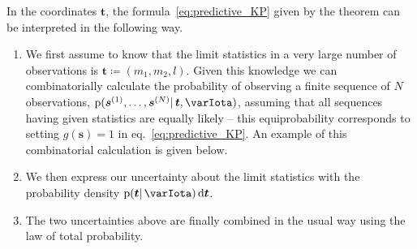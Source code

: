 \documentclass[\ifafour a4paper,12pt,\else a5paper,10pt,\fi%
onecolumn,oneside,article,%
british%
]{memoir}
\theoremstyle{remark}
\theoremstyle{innote}
\newcommand*{\di}{\mathrm{d}}%
\newcommand*{\defd}{\coloneqq}
\newcommand*{\pf}{\mathrm{p}}%
\renewcommand*{\|}{\mathpunct{|}}
\newcommand*{\eqn}{eq.}%
\newcommand*{\yI}{\varIota}
\newcommand*{\ys}{\bm{s}}
\newcommand*{\yso}[1]{\ys^{(#1)}}
\newcommand*{\yt}{\bm{t}}
\begin{document}
\bigskip

In the coordinates $\yt$, the formula~\eqref{eq:predictive_KP} given
by the theorem can be interpreted in the following way.
\begin{enumerate}[label=(\textit{\arabic*})]
\item We first assume to know that the limit statistics in a very large
  number of observations is $\yt \defd (m_1, m_2, l)$. Given this knowledge
  we can combinatorially calculate the probability of observing a finite
  sequence of $N$ observations, $\pf(\yso{1}, \dotsc, \yso{N} \|\yt,\yI)$,
  assuming that all sequences having given statistics are equally likely --
  this equiprobability corresponds to setting $g(\ys)=1$ in
  \eqn~\eqref{eq:predictive_KP}. An example of this combinatorial
  calculation is given below.
\item We then express our uncertainty about the limit statistics with the
  probability density $\pf(\yt \| \yI)\,\di\yt$.
\item The two uncertainties above are finally combined in the usual way
  using the law of total probability.
\end{enumerate}

\smallskip
\end{document}
